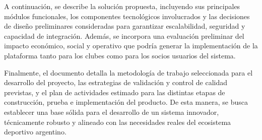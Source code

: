 A continuación, se describe la solución propuesta, incluyendo sus principales módulos funcionales, los componentes tecnológicos involucrados y las decisiones de diseño preliminares consideradas para garantizar escalabilidad, seguridad y capacidad de integración. Además, se incorpora una evaluación preliminar del impacto económico, social y operativo que podría generar la implementación de la plataforma tanto para los clubes como para los socios usuarios del sistema.

Finalmente, el documento detalla la metodología de trabajo seleccionada para el desarrollo del proyecto, las estrategias de validación y control de calidad previstas, y el plan de actividades estimado para las distintas etapas de construcción, prueba e implementación del producto. De esta manera, se busca establecer una base sólida para el desarrollo de un sistema innovador, técnicamente robusto y alineado con las necesidades reales del ecosistema deportivo argentino.

